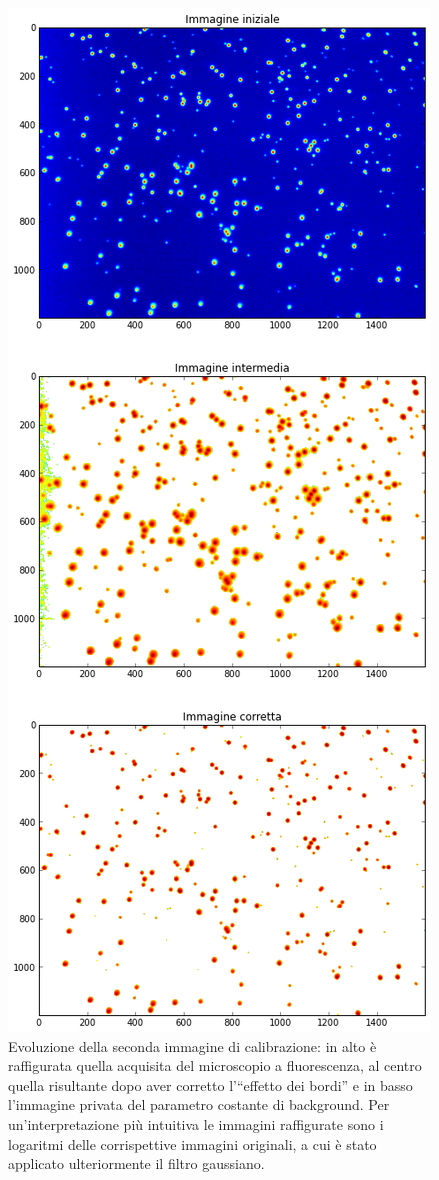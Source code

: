 \begin{figure}
 \centering
 \includegraphics[scale=.50]{img/CAP4lg2.png}
 \caption{\small{Evoluzione della seconda immagine di calibrazione: in alto è raffigurata quella acquisita del microscopio a fluorescenza, al centro quella risultante dopo aver corretto l'``effetto dei bordi'' e in basso l'immagine privata del parametro costante di background. Per un'interpretazione più intuitiva le immagini raffigurate sono i logaritmi delle corrispettive immagini originali, a cui è stato applicato ulteriormente il filtro gaussiano.}}
 \label{fig:lg2}
\end{figure}

